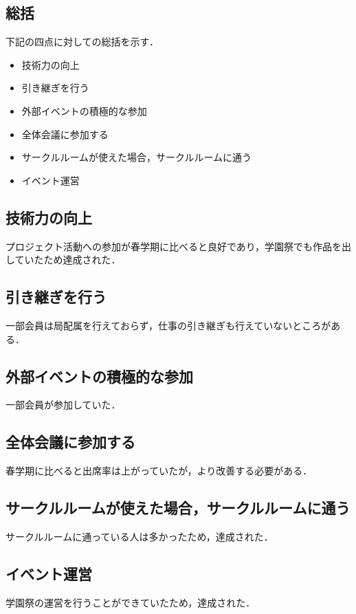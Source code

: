 \subsection*{\secondGrade{}総括}


下記の四点に対しての総括を示す．
\begin{itemize}
    \item 技術力の向上
    \item 引き継ぎを行う
    \item 外部イベントの積極的な参加
    \item 全体会議に参加する
    \item サークルルームが使えた場合，サークルルームに通う
    \item イベント運営
\end{itemize}

\subsection*{技術力の向上}
プロジェクト活動への参加が春学期に比べると良好であり，学園祭でも作品を出していたため達成された．
\subsection*{引き継ぎを行う}
一部会員は局配属を行えておらず，仕事の引き継ぎも行えていないところがある．
\subsection*{外部イベントの積極的な参加}
一部会員が参加していた．
\subsection*{全体会議に参加する}
春学期に比べると出席率は上がっていたが，より改善する必要がある．
\subsection*{サークルルームが使えた場合，サークルルームに通う}
サークルルームに通っている人は多かったため，達成された．
\subsection*{イベント運営}
学園祭の運営を行うことができていたため，達成された．
